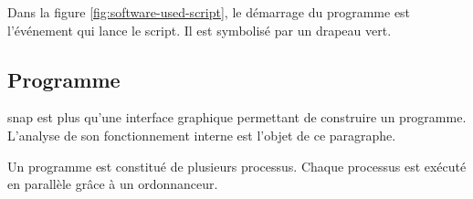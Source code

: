 Dans la figure \ref{fig:software-used-script}, le démarrage du programme est l'événement qui lance le script. Il est symbolisé par un drapeau vert.

\subsection{Programme}
\gls{snap} est plus qu'une interface graphique permettant de construire un programme. L'analyse de son fonctionnement interne est l'objet de ce paragraphe.

Un programme est constitué de plusieurs processus. Chaque processus est exécuté en parallèle grâce à un ordonnanceur.

%
%
%
%
%

